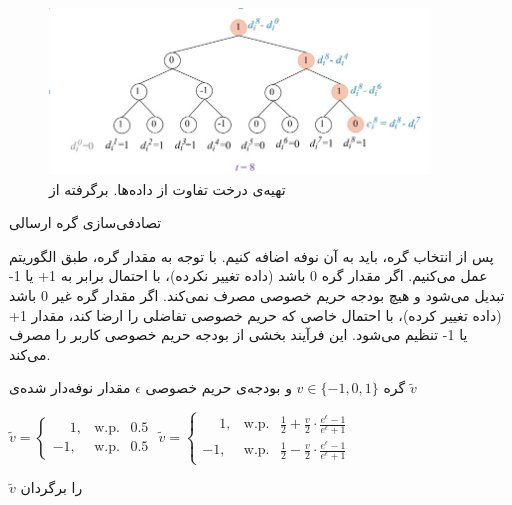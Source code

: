 \begin{figure}[h]
    \centering
    \includegraphics[width=0.9\textwidth]{figs/ddrm.jpg}
    \caption{تهیه‌ی درخت تفاوت از داده‌ها. برگرفته از }
    \label{fig:ddrmDifferenceTree}
\end{figure}

 تصادفی‌سازی گره ارسالی

پس از انتخاب گره، باید به آن نوفه اضافه کنیم. با توجه به مقدار گره، طبق الگوریتم  عمل می‌کنیم. اگر مقدار گره 0 باشد (داده تغییر نکرده)، با احتمال برابر به 1+ یا 1- تبدیل می‌شود و هیچ بودجه حریم خصوصی مصرف نمی‌کند. اگر مقدار گره غیر 0 باشد (داده تغییر کرده)، با احتمال خاصی که حریم خصوصی تفاضلی را ارضا کند، مقدار 1+ یا 1- تنظیم می‌شود.  این فرآیند بخشی از بودجه حریم خصوصی کاربر را مصرف می‌کند.

 گره $v \in \{-1, 0, 1\}$ و بودجه‌ی حریم خصوصی $\epsilon$
 مقدار نوفه‌دار شده‌ی $\tilde{v}$

      $\tilde{v} = 
        \begin{cases} 
        \phantom{-}1, & \text{w.p. } \hspace{5pt} 0.5 \\
        -1, & \text{w.p. } \hspace{5pt} 0.5
        \end{cases}$
\Else
     $\tilde{v} = 
        \begin{cases} 
        \phantom{-}1, & \text{w.p. } \hspace{5pt} \frac{1}{2} + \frac{v}{2} \cdot \frac{e^{\epsilon}-1}{e^{\epsilon}+1} \\
        -1, & \text{w.p. } \hspace{5pt} \frac{1}{2} - \frac{v}{2} \cdot \frac{e^{\epsilon}-1}{e^{\epsilon}+1}
        \end{cases}$
\EndIf

 $\tilde{v}$ را برگردان

